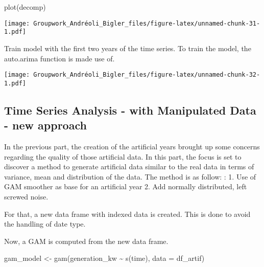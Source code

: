 \documentclass[
]{article}
\newenvironment{Shaded}{\begin{snugshade}}{\end{snugshade}}
\newcommand{\AttributeTok}[1]{\textcolor[rgb]{0.77,0.63,0.00}{#1}}
\newcommand{\DecValTok}[1]{\textcolor[rgb]{0.00,0.00,0.81}{#1}}
\newcommand{\FunctionTok}[1]{\textcolor[rgb]{0.00,0.00,0.00}{#1}}
\newcommand{\NormalTok}[1]{#1}
\newcommand{\OtherTok}[1]{\textcolor[rgb]{0.56,0.35,0.01}{#1}}
\newcommand{\SpecialCharTok}[1]{\textcolor[rgb]{0.00,0.00,0.00}{#1}}
\begin{document}
\begin{Shaded}
\begin{Highlighting}[]
\FunctionTok{plot}\NormalTok{(decomp)}
\end{Highlighting}
\end{Shaded}

\texttt{[image: Groupwork\_Andréoli\_Bigler\_files/figure-latex/unnamed-chunk-31-1.pdf]}

Train model with the first two years of the time series. To train the
model, the auto.arima function is made use of.

\texttt{[image: Groupwork\_Andréoli\_Bigler\_files/figure-latex/unnamed-chunk-32-1.pdf]}

\hypertarget{time-series-analysis---with-manipulated-data---new-approach}{%
\subsection{Time Series Analysis - with Manipulated Data - new
approach}\label{time-series-analysis---with-manipulated-data---new-approach}}

In the previous part, the creation of the artificial years brought up
some concerns regarding the quality of those artificial data. In this
part, the focus is set to discover a method to generate artificial data
similar to the real data in terms of variance, mean and distribution of
the data. The method is as follow: : 1. Use of GAM smoother as base for
an artificial year 2. Add normally distributed, left screwed noise.

For that, a new data frame with indexed data is created. This is done to
avoid the handling of date type.

\begin{Shaded}
\end{Shaded}

Now, a GAM is computed from the new data frame.

\begin{Shaded}
\begin{Highlighting}[]
\NormalTok{gam\_model }\OtherTok{\textless{}{-}} \FunctionTok{gam}\NormalTok{(generation\_kw }\SpecialCharTok{\textasciitilde{}} \FunctionTok{s}\NormalTok{(time), }\AttributeTok{data =}\NormalTok{ df\_artif)}
\end{Highlighting}
\end{Shaded}
\end{document}

